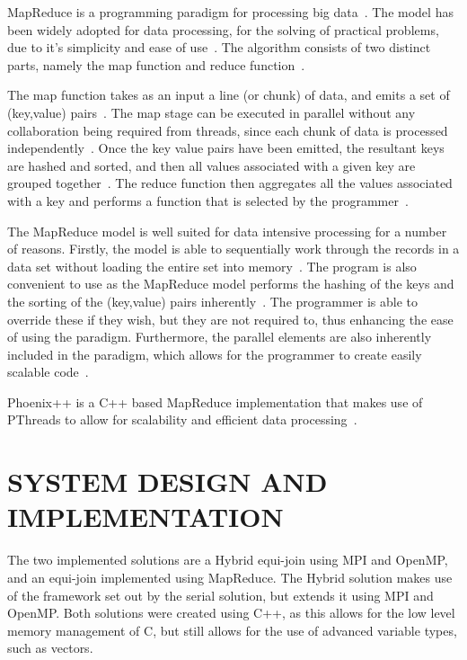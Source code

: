 \documentclass[12pt,twocolumn]{witseiepaper}
\begin{document}
MapReduce is a programming paradigm for processing big data~\cite{comparingMPIMapReduce}. The model has been widely adopted for data processing, for the solving of practical problems, due to it's simplicity and ease of use~\cite{comparingMPIMapReduce, mapReduceJoin}. The algorithm consists of two distinct parts, namely the map function and reduce function~\cite{phoenix}. 

The map function takes as an input a line (or chunk) of data, and emits a set of (key,value) pairs~\cite{phoenix}. The map stage can be executed in parallel without any collaboration being required from threads, since each chunk of data is processed independently~\cite{comparingMPIMapReduce}. Once the key value pairs have been emitted, the resultant keys are hashed and sorted, and then all values associated with a given key are grouped together~\cite{phoenix}. The reduce function then aggregates all the values associated with a key and performs a function that is selected by the programmer~\cite{comparingMPIMapReduce}.

The MapReduce model is well suited for data intensive processing for a number of reasons. Firstly, the model is able to sequentially work through the records in a data set without loading the entire set into memory~\cite{comparingMPIMapReduce}. The program is also convenient to use as the MapReduce model performs the hashing of the keys and the sorting of the (key,value) pairs inherently~\cite{phoenix}. The programmer is able to override these if they wish, but they are not required to, thus enhancing the ease of using the paradigm. Furthermore, the parallel elements are also inherently included in the paradigm, which allows for the programmer to create easily scalable code~\cite{comparingMPIMapReduce}. 

Phoenix++ is a C++ based MapReduce implementation that makes use of PThreads to allow for scalability and efficient data processing~\cite{phoenix}.

\section{SYSTEM DESIGN AND IMPLEMENTATION}
The two implemented solutions are a Hybrid equi-join using MPI and OpenMP, and an equi-join implemented using MapReduce. The Hybrid solution makes use of the framework set out by the serial solution, but extends it using MPI and OpenMP. Both solutions were created using C++, as this allows for the low level memory management of C, but still allows for the use of advanced variable types, such as vectors.
\end{document}
